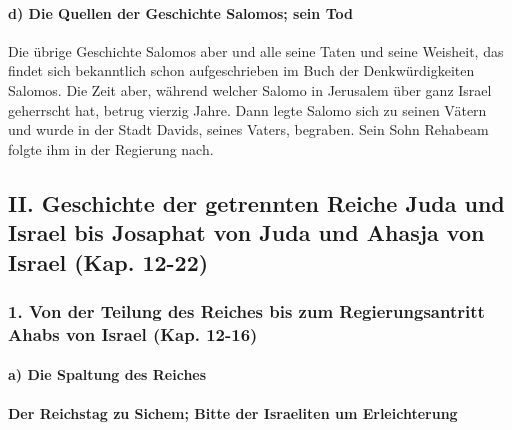 \hypertarget{d-die-quellen-der-geschichte-salomos-sein-tod}{%
\paragraph{d) Die Quellen der Geschichte Salomos; sein
Tod}\label{d-die-quellen-der-geschichte-salomos-sein-tod}}

Die übrige Geschichte Salomos aber und alle seine Taten
und seine Weisheit, das findet sich bekanntlich schon aufgeschrieben im
Buch der Denkwürdigkeiten Salomos. Die Zeit aber, während
welcher Salomo in Jerusalem über ganz Israel geherrscht hat, betrug
vierzig Jahre. Dann legte Salomo sich zu seinen Vätern
und wurde in der Stadt Davids, seines Vaters, begraben. Sein Sohn
Rehabeam folgte ihm in der Regierung nach.

\hypertarget{ii.-geschichte-der-getrennten-reiche-juda-und-israel-bis-josaphat-von-juda-und-ahasja-von-israel-kap.-12-22}{%
\subsection{II. Geschichte der getrennten Reiche Juda und Israel bis
Josaphat von Juda und Ahasja von Israel (Kap.
12-22)}\label{ii.-geschichte-der-getrennten-reiche-juda-und-israel-bis-josaphat-von-juda-und-ahasja-von-israel-kap.-12-22}}

\hypertarget{von-der-teilung-des-reiches-bis-zum-regierungsantritt-ahabs-von-israel-kap.-12-16}{%
\subsubsection{1. Von der Teilung des Reiches bis zum Regierungsantritt
Ahabs von Israel (Kap.
12-16)}\label{von-der-teilung-des-reiches-bis-zum-regierungsantritt-ahabs-von-israel-kap.-12-16}}

\hypertarget{a-die-spaltung-des-reiches}{%
\paragraph{a) Die Spaltung des
Reiches}\label{a-die-spaltung-des-reiches}}

\hypertarget{der-reichstag-zu-sichem-bitte-der-israeliten-um-erleichterung}{%
\paragraph{Der Reichstag zu Sichem; Bitte der Israeliten um
Erleichterung}\label{der-reichstag-zu-sichem-bitte-der-israeliten-um-erleichterung}}

